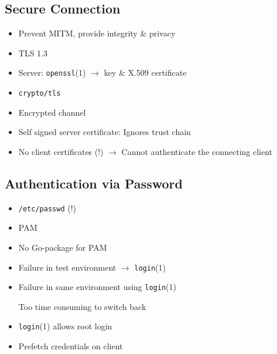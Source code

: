 \documentclass[
	xcolor=dvipsnames,
]{beamer}
\newenvironment{zhawframe}[1][]
{\begin{frame}[environment=fr,#1]{\insertsectionhead}{\insertsubsectionhead}}
{\end{frame}
}
\begin{document}
\subsection{Secure Connection}
\begin{zhawframe}
\begin{itemize}
\item<1-> Prevent MITM, provide integrity \& privacy
\item<2-> TLS 1.3
\item<3-> Server: \texttt{openssl}(1) $\rightarrow$ key \& X.509 certificate
\item<4-> \texttt{crypto/tls}
\item<5-> Encrypted channel
\item<6-> Self signed server certificate: Ignores trust chain
\item<7-> No client certificates (!) $\rightarrow$ Cannot authenticate the connecting client
\end{itemize}
\end{zhawframe}

\subsection{Authentication via Password}
\begin{zhawframe}
\begin{itemize}
\item<1-> \texttt{/etc/passwd} (!)
\item<2-> PAM
\item<3-> No Go-package for PAM
\item<4-> Failure in test environment $\rightarrow$ \texttt{login}(1)
\item<5-> Failure in same environment using \texttt{login}(1)

Too time consuming to switch back
\item<6-> \texttt{login}(1) allows root login
\item<7-> Prefetch credentials on client
\end{itemize}
\end{zhawframe}
\end{document}
